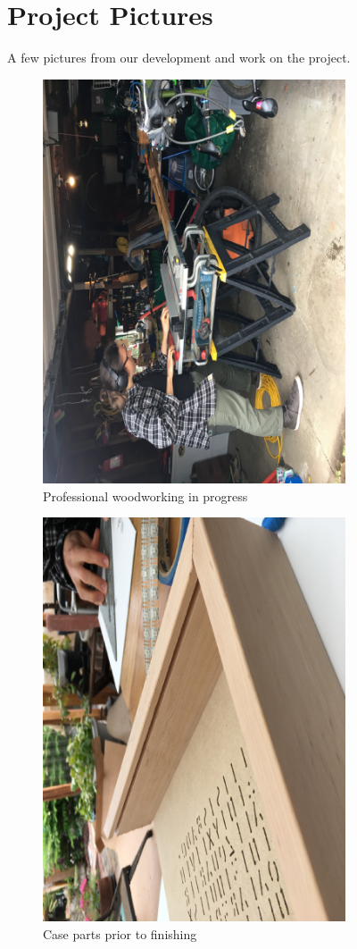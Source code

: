 \documentclass[onecolumn, draftclsnofoot,10pt, compsoc]{IEEEtran}
\begin{document}
\section{Project Pictures}
A few pictures from our development and work on the project.
\centering
\begin{figure}
\caption{Professional woodworking in progress}
\includegraphics[width=0.8\textwidth, natwidth=600,natheight=800]{./exPics/scott.eps} %
\end{figure}
\begin{figure}
\caption{Case parts prior to finishing}
\includegraphics[width=0.8\textwidth, natwidth=600,natheight=800]{./exPics/wood.eps}
\end{figure}
\end{document}
